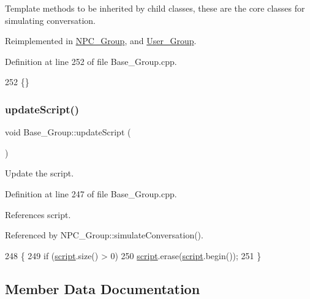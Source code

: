 Template methods to be inherited by child classes, these are the core classes for simulating conversation. 



Reimplemented in \hyperlink{class_n_p_c___group_a139f16a36dba893743e227ea276fd5e7}{N\+P\+C\+\_\+\+Group}, and \hyperlink{class_user___group_a0142ca8121ea4bb4d881153e48e486f9}{User\+\_\+\+Group}.



Definition at line 252 of file Base\+\_\+\+Group.\+cpp.


\begin{DoxyCode}
252 \{\}
\end{DoxyCode}
\mbox{\label{class_base___group_a8c16feac44492aa68f4ee758662892c8}} 
\subsubsection{\texorpdfstring{update\+Script()}{updateScript()}}
{\footnotesize\ttfamily void Base\+\_\+\+Group\+::update\+Script (\begin{DoxyParamCaption}{ }\end{DoxyParamCaption})}



Update the script. 



Definition at line 247 of file Base\+\_\+\+Group.\+cpp.



References script.



Referenced by N\+P\+C\+\_\+\+Group\+::simulate\+Conversation().


\begin{DoxyCode}
248 \{
249     \textcolor{keywordflow}{if} (\hyperlink{class_base___group_a98fbcb0bb85a488e29db9465c18715cc}{script}.size() > 0)
250         \hyperlink{class_base___group_a98fbcb0bb85a488e29db9465c18715cc}{script}.erase(\hyperlink{class_base___group_a98fbcb0bb85a488e29db9465c18715cc}{script}.begin());
251 \}
\end{DoxyCode}


\subsection{Member Data Documentation}
\mbox{\label{class_base___group_a8eb46d3107d53da0f5fbea2410b4b095}} 
